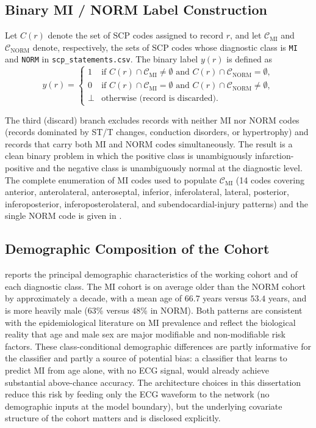 \subsection{Binary MI / NORM Label Construction}

Let $C(r)$ denote the set of SCP codes assigned to record $r$, and let $\mathcal{C}_{\mathrm{MI}}$ and $\mathcal{C}_{\mathrm{NORM}}$ denote, respectively, the sets of SCP codes whose diagnostic class is \texttt{MI} and \texttt{NORM} in \texttt{scp\_statements.csv}. The binary label $y(r)$ is defined as
\begin{equation}
y(r) = \begin{cases}
1 & \text{if } C(r) \cap \mathcal{C}_{\mathrm{MI}} \neq \emptyset \text{ and } C(r) \cap \mathcal{C}_{\mathrm{NORM}} = \emptyset, \\
0 & \text{if } C(r) \cap \mathcal{C}_{\mathrm{MI}} = \emptyset \text{ and } C(r) \cap \mathcal{C}_{\mathrm{NORM}} \neq \emptyset, \\
\bot & \text{otherwise (record is discarded)}.
\end{cases}
\end{equation}

The third (discard) branch excludes records with neither MI nor NORM codes (records dominated by ST/T changes, conduction disorders, or hypertrophy) and records that carry both MI and NORM codes simultaneously. The result is a clean binary problem in which the positive class is unambiguously infarction-positive and the negative class is unambiguously normal at the diagnostic level. The complete enumeration of MI codes used to populate $\mathcal{C}_{\mathrm{MI}}$ (14 codes covering anterior, anterolateral, anteroseptal, inferior, inferolateral, lateral, posterior, inferoposterior, inferoposterolateral, and subendocardial-injury patterns) and the single NORM code is given in .

\subsection{Demographic Composition of the Cohort}

 reports the principal demographic characteristics of the working cohort and of each diagnostic class. The MI cohort is on average older than the NORM cohort by approximately a decade, with a mean age of $66.7$ years versus $53.4$ years, and is more heavily male ($63$\% versus $48$\% in NORM). Both patterns are consistent with the epidemiological literature on MI prevalence and reflect the biological reality that age and male sex are major modifiable and non-modifiable risk factors. These class-conditional demographic differences are partly informative for the classifier and partly a source of potential bias: a classifier that learns to predict MI from age alone, with no ECG signal, would already achieve substantial above-chance accuracy. The architecture choices in this dissertation reduce this risk by feeding only the ECG waveform to the network (no demographic inputs at the model boundary), but the underlying covariate structure of the cohort matters and is disclosed explicitly.

